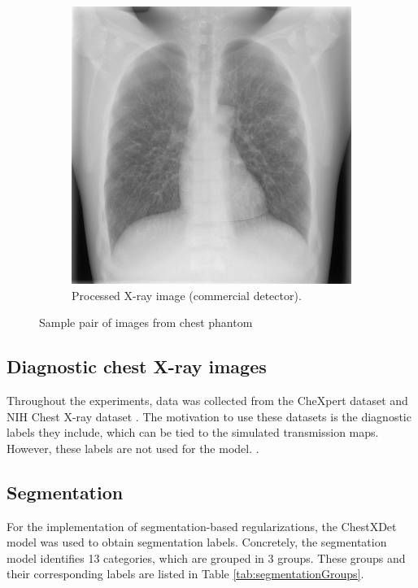 \documentclass[nomenclature, english, bibtex]{kththesis}
\numberwithin{listing}{chapter}
\begin{document}
\begin{figure}[H]
\begin{subfigure}[t]{0.45\textwidth}
        \includegraphics[width=\textwidth]{figures/comm_processed_sample.jpg}
        \caption{Processed X-ray image (commercial detector).}
    \end{subfigure}
    \caption{Sample pair of images from chest phantom}
    \label{fig:chestPhantomImages}
\end{figure}


\subsection{Diagnostic chest X-ray images}

Throughout the experiments, data was collected from the CheXpert dataset
\cite{chexpert} and NIH Chest X-ray dataset \cite{nih}. The motivation to use these datasets is the diagnostic
labels they include, which can be tied to the simulated transmission maps. However, these labels are not used for
the model. .

\subsection{Segmentation}

For the implementation of segmentation-based regularizations,
the ChestXDet \cite{chestxdet} model was used to obtain segmentation
labels. Concretely, the segmentation model identifies 13 categories, which are grouped in 3 groups. These groups and their corresponding
labels are listed in Table \ref{tab:segmentationGroups}.
\end{document}
